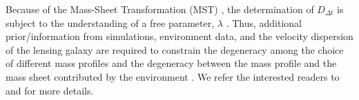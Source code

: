 \documentclass[useAMS,usenatbib]{mnras}
\newcommand{\Ddt}{D_{\Delta t}}
\begin{document}
Because of the Mass-Sheet Transformation (MST) \citep{FalcoEtal85,SchneiderSluse13,SchneiderSluse14}, the determination of $\Ddt$ is subject to the understanding of a free parameter, $\lambda$ \citep[see also the discussion in][]{BirrerEtal18}. Thus, additional prior/information from simulations, environment data, and the velocity dispersion of the lensing galaxy are required to constrain the degeneracy among the choice of different mass profiles and the degeneracy between the mass profile and the mass sheet contributed by the environment \citep[][]{SuyuEtal10,FassnachtEtal11,RusuEtal17,TihhonovaEtal17}. We refer the interested readers to \citet{TreuMarshall16} and \citet{SuyuEtal18} for more details.
\end{document}
